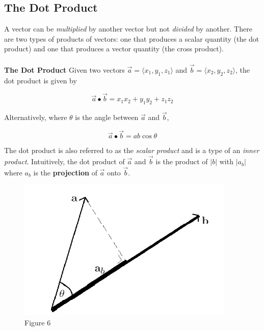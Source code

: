 \documentclass{article}
\begin{document}
        \subsection{The Dot Product}
            A vector can be \emph{multiplied} by another vector but not \emph{divided} by another.
            There are two types of products of vectors: one that produces a scalar quantity
            (the dot product) and one that produces a vector quantity (the cross product). \\\\

            \noindent \textbf{The Dot Product} Given two vectors $\overrightarrow{a}=\langle x_1, y_1, z_1\rangle$
            and $\overrightarrow{b}=\langle x_2, y_2, z_2\rangle$, the dot product is given by

            \begin{equation*}
                \overrightarrow{a}\bullet\overrightarrow{b}=x_1x_2+y_1y_2+z_1z_2
            \end{equation*}

            \noindent Alternatively, where $\theta$ is the angle between $\overrightarrow{a}$
            and $\overrightarrow{b}$,

            \begin{equation*}
                \overrightarrow{a}\bullet\overrightarrow{b}=ab\cos{\theta}
            \end{equation*}

            \noindent The dot product is also referred to as the \emph{scalar product} and is a type
            of an \emph{inner product}. Intuitively, the dot product of $\overrightarrow{a}$ and
            $\overrightarrow{b}$ is the product of $|b|$ with $|a_b|$ where $a_b$ is the
            \textbf{projection} of $\overrightarrow{a}$ onto $\overrightarrow{b}$.

            \begin{figure}[h]
                \centering
                \includegraphics[scale=0.4]{Resources/Unit3Vectors/dotproduct1.PNG}
                \caption*{Figure 6}
            \end{figure}
\end{document}
